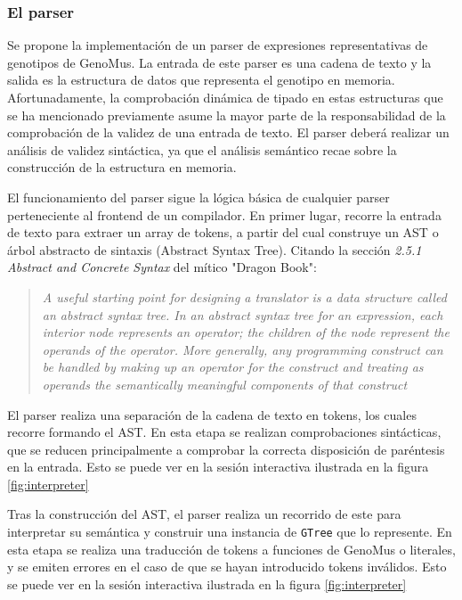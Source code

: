 \subsubsection{El parser}

Se propone la implementación de un parser de expresiones representativas de genotipos de GenoMus. La entrada de este parser es una cadena de texto y la salida es la estructura de datos que representa el genotipo en memoria. Afortunadamente, la comprobación dinámica de tipado en estas estructuras que se ha mencionado previamente asume la mayor parte de la responsabilidad de la comprobación de la validez de una entrada de texto. El parser deberá realizar un análisis de validez sintáctica, ya que el análisis semántico recae sobre la construcción de la estructura en memoria. 

El funcionamiento del parser sigue la lógica básica de cualquier parser perteneciente al frontend de un compilador. En primer lugar, recorre la entrada de texto para extraer un array de tokens, a partir del cual construye un AST o árbol abstracto de sintaxis (Abstract Syntax Tree). Citando la sección \textit{2.5.1 Abstract and Concrete Syntax} del mítico "Dragon Book"\cite{dragon-book-ast}:

\begin{quote}
    \textit{
    A useful starting point for designing a translator is a data structure called an abstract syntax tree. In an abstract syntax tree for an expression, each interior node represents an operator; the children of the node represent the operands of the operator. More generally, any programming construct can be handled by making up an operator for the construct and treating as operands the semantically meaningful components of that construct
    }
\end{quote}

El parser realiza una separación de la cadena de texto en tokens, los cuales recorre formando el AST. En esta etapa se realizan comprobaciones sintácticas, que se reducen principalmente a comprobar la correcta disposición de paréntesis en la entrada. Esto se puede ver en la sesión interactiva ilustrada en la figura \ref{fig:interpreter}

Tras la construcción del AST, el parser realiza un recorrido de este para interpretar su semántica y construir una instancia de \verb|GTree| que lo represente. En esta etapa se realiza una traducción de tokens a funciones de GenoMus o literales, y se emiten errores en el caso de que se hayan introducido tokens inválidos. Esto se puede ver en la sesión interactiva ilustrada en la figura \ref{fig:interpreter} 

